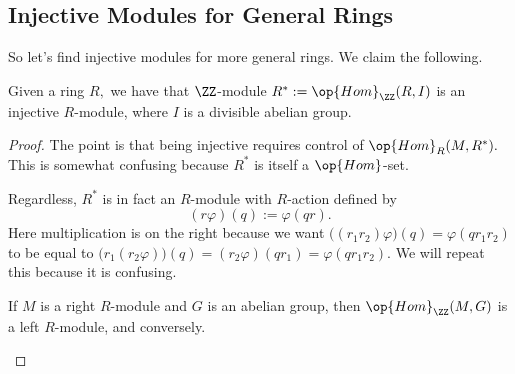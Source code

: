 \documentclass[../notes.tex]{subfiles}
\begin{document}
\subsection{Injective Modules for General Rings}
So let's find injective modules for more general rings. We claim the following.
\begin{proposition} \label{prop:injecexist}
	Given a ring $R,$ we have that $\ZZ$-module $R^*:=\op{Hom}_\ZZ(R,I)$ is an injective $R$-module, where $I$ is a divisible abelian group.
\end{proposition}
\begin{proof}
	The point is that being injective requires control of $\op{Hom}_R(M,R^*).$ This is somewhat confusing because $R^*$ is itself a $\op{Hom}$-set.

	Regardless, $R^*$ is in fact an $R$-module with $R$-action defined by
	\[(r\varphi)(q):=\varphi(qr).\]
	Here multiplication is on the right because we want $\big((r_1r_2)\varphi\big)(q)=\varphi(qr_1r_2)$ to be equal to $\big(r_1(r_2\varphi)\big)(q)=(r_2\varphi)(qr_1)=\varphi(qr_1r_2).$ We will repeat this because it is confusing.
	\begin{warn}
		If $M$ is a right $R$-module and $G$ is an abelian group, then $\op{Hom}_\ZZ(M,G)$ is a left $R$-module, and conversely.
	\end{warn}
	

\end{proof}
\end{document}
